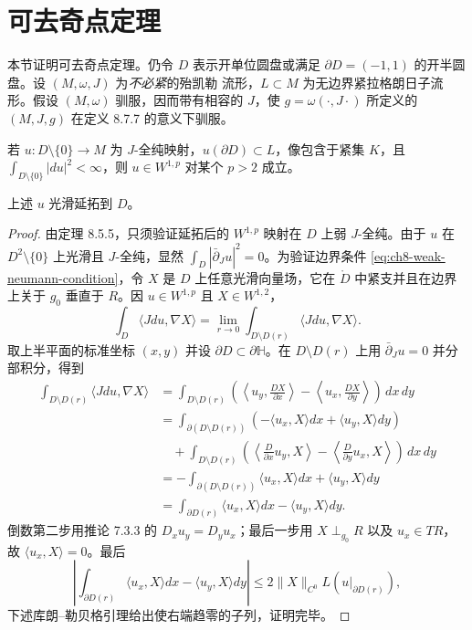 \section{可去奇点定理}
\label{sec:removable-singularity-theorem}

本节证明可去奇点定理。仍令 $D$ 表示开单位圆盘或满足
$\partial D=(-1,1)$ 的开半圆盘。设 $(M,\omega,J)$ 为\emph{不必紧}的殆凯勒
流形，$L\subset M$ 为无边界紧拉格朗日子流形。假设 $(M,\omega)$ 驯服，因而带有相容的 $J$，使
$g=\omega(\cdot,J\cdot)$ 所定义的 $(M,J,g)$ 在定义 8.7.7 的意义下驯服。
\begin{theorem}\label{thm:ch8-removable-singularity-w1p}
若 $u:D\setminus\{0\}\to M$ 为 $J$-全纯映射，$u(\partial D)\subset L$，像包含于紧集 $K$，且 $\int_{D\setminus\{0\}}|du|^2<\infty$，则 $u\in W^{1,p}$ 对某个 $p>2$ 成立。
\end{theorem}
\begin{corollary}\label{cor:ch8-removable-singularity-smooth}
上述 $u$ 光滑延拓到 $D$。
\end{corollary}
\begin{proof}
由定理 8.5.5，只须验证延拓后的 $W^{1,p}$ 映射在 $D$ 上弱 $J$-全纯。由于
$u$ 在 $D^2\setminus\{0\}$ 上光滑且 $J$-全纯，显然
$\int_D|\bar\partial_Ju|^2=0$。为验证边界条件
\eqref{eq:ch8-weak-neumann-condition}，令 $X$ 是 $D$ 上任意光滑向量场，它在
$\mathring D$ 中紧支并且在边界上关于 $g_0$ 垂直于 $R$。因
$u\in W^{1,p}$ 且 $X\in W^{1,2}$，
\[
 \int_D\langle Jdu,\nabla X\rangle
 =\lim_{r\to0}\int_{D\setminus D(r)}\langle Jdu,\nabla X\rangle.
\]
取上半平面的标准坐标 $(x,y)$ 并设 $\partial D\subset\partial\mathbb H$。在
$D\setminus D(r)$ 上用 $\bar\partial_Ju=0$ 并分部积分，得到
\begin{align*}
 \int_{D\setminus D(r)}\langle Jdu,\nabla X\rangle
 &=\int_{D\setminus D(r)}
 \left(\left\langle u_y,\frac{DX}{\partial x}\right\rangle
 -\left\langle u_x,\frac{DX}{\partial y}\right\rangle\right)\,dx\,dy\\
 &=\int_{\partial(D\setminus D(r))}
 \left(-\langle u_x,X\rangle dx+\langle u_y,X\rangle dy\right)\\
 &\quad+\int_{D\setminus D(r)}
 \left(\left\langle\frac D{\partial x}u_y,X\right\rangle
 -\left\langle\frac D{\partial y}u_x,X\right\rangle\right)\,dx\,dy\\
 &=-\int_{\partial(D\setminus D(r))}\langle u_x,X\rangle dx
 +\langle u_y,X\rangle dy\\
 &=\int_{\partial D(r)}\langle u_x,X\rangle dx-\langle u_y,X\rangle dy.
\end{align*}
倒数第二步用推论 7.3.3 的
$D_xu_y=D_yu_x$；最后一步用 $X\perp_{g_0}R$ 以及 $u_x\in TR$，故
$\langle u_x,X\rangle=0$。最后
\[
 \left|\int_{\partial D(r)}\langle u_x,X\rangle dx-\langle u_y,X\rangle dy\right|
 \leq2\|X\|_{C^0}L(u|_{\partial D(r)}),
\]
下述库朗--勒贝格引理给出使右端趋零的子列，证明完毕。
\end{proof}


